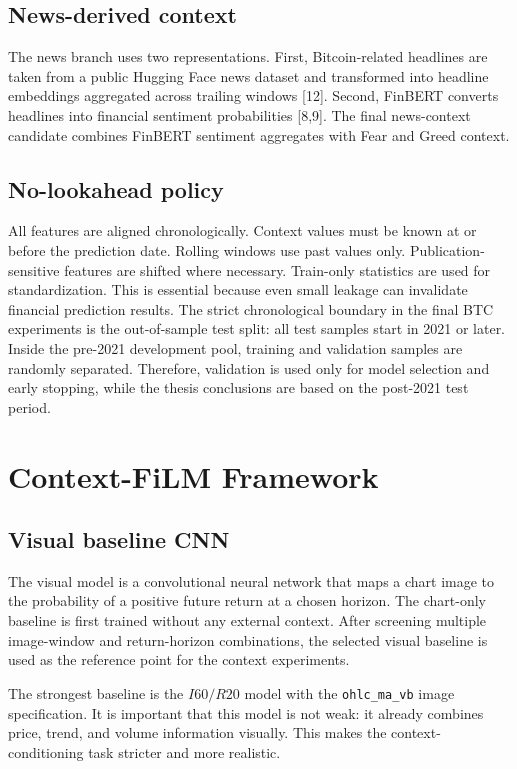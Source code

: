 \documentclass[14pt,a4paper]{extarticle}
\newcommand{\code}[1]{\texttt{#1}}
\begin{document}
\subsection{News-derived context}

The news branch uses two representations. First, Bitcoin-related headlines are taken from a public Hugging Face news dataset and transformed into headline embeddings aggregated across trailing windows [12]. Second, FinBERT converts headlines into financial sentiment probabilities [8,9]. The final news-context candidate combines FinBERT sentiment aggregates with Fear and Greed context.

\subsection{No-lookahead policy}

All features are aligned chronologically. Context values must be known at or before the prediction date. Rolling windows use past values only. Publication-sensitive features are shifted where necessary. Train-only statistics are used for standardization. This is essential because even small leakage can invalidate financial prediction results. The strict chronological boundary in the final BTC experiments is the out-of-sample test split: all test samples start in 2021 or later. Inside the pre-2021 development pool, training and validation samples are randomly separated. Therefore, validation is used only for model selection and early stopping, while the thesis conclusions are based on the post-2021 test period.

\clearpage

\section{Context-FiLM Framework}

\subsection{Visual baseline CNN}

The visual model is a convolutional neural network that maps a chart image to the probability of a positive future return at a chosen horizon. The chart-only baseline is first trained without any external context. After screening multiple image-window and return-horizon combinations, the selected visual baseline is used as the reference point for the context experiments.

The strongest baseline is the $I60/R20$ model with the \code{ohlc\_ma\_vb} image specification. It is important that this model is not weak: it already combines price, trend, and volume information visually. This makes the context-conditioning task stricter and more realistic.
\end{document}
